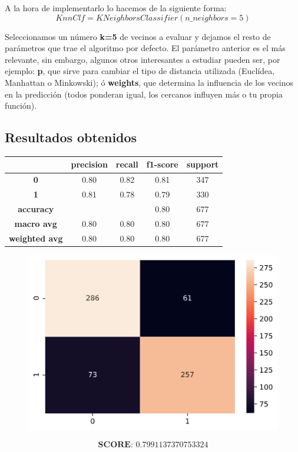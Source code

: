 \documentclass[11pt,a4paper]{article}
\begin{document}
\newpage
A la hora de implementarlo lo hacemos de la siguiente forma:
$$KnnClf = KNeighborsClassifier(n\_neighbors=5)$$

Seleccionamos un número \textbf{k=5} de vecinos a evaluar y dejamos el resto de parámetros que trae el algoritmo por defecto. El
parámetro anterior es el más relevante, sin embargo, algunos otros interesantes a estudiar pueden ser, por ejemplo: \textbf{p},
que sirve para cambiar el tipo de distancia utilizada (Euclídea, Manhattan o Minkowski); ó \textbf{weights}, que determina la
influencia de los vecinos en la predicción (todos ponderan igual, los cercanos influyen más o tu propia función).

\subsection*{Resultados obtenidos}
\begin{table}[H]
    \centering
    \begin{tabular}{c|cccc}
        \textbf{} & \textbf{precision} & \textbf{recall} & \textbf{f1-score} & \textbf{support} \\ \hline
        \textbf{0} & 0.80 & 0.82 & 0.81 & 347 \\
        \textbf{1} & 0.81 & 0.78 & 0.79 & 330 \\ \hline
        \textbf{accuracy} &  &  & 0.80 & 677 \\
        \textbf{macro avg} & 0.80 & 0.80 & 0.80 & 677 \\
        \textbf{weighted avg} & 0.80 & 0.80 & 0.80 & 677
    \end{tabular}
\end{table}

\begin{figure}[H]
    \centering
    \includegraphics[scale=0.5]{img/matrix-knn.png}    
\end{figure}
\vspace{-20px}
$$\textbf{SCORE:  } 0.7991137370753324$$
\end{document}
